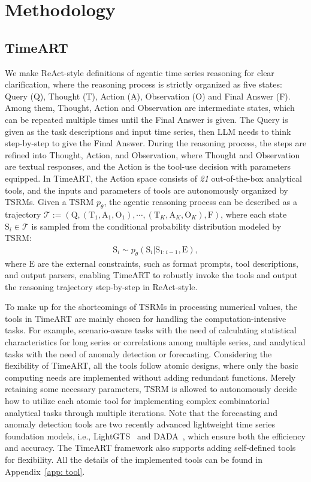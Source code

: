 \section{Methodology}

\subsection{TimeART}
\label{sec: timeart}
We make ReAct-style definitions of agentic time series reasoning for clear clarification, where the reasoning process is strictly organized as five states: Query (Q), Thought (T), Action (A), Observation (O) and Final Answer (F). Among them, Thought, Action and Observation are intermediate states, which can be repeated multiple times until the Final Answer is given. The Query is given as the task descriptions and input time series, then LLM needs to think step-by-step to give the Final Answer. During the reasoning process, the steps are refined into Thought, Action, and Observation, where Thought and Observation are textual responses, and the Action is the tool-use decision with parameters equipped. In TimeART, the Action space consists of \textit{21} out-of-the-box analytical tools, and the inputs and parameters of tools are autonomously organized by TSRMs. Given a TSRM $p_\theta$, the agentic reasoning process can be described as a trajectory $\mathcal{T} := (\mathrm{Q}, (\mathrm{T}_1, \mathrm{A}_1, \mathrm{O}_1),\cdots,(\mathrm{T}_K, \mathrm{A}_K, \mathrm{O}_K), \mathrm{F})$, where each state $\mathrm{S}_i \in \mathcal{T}$ is sampled from the conditional probability distribution modeled by TSRM:
\begin{gather}
    \mathrm{S}_i \sim p_\theta (\mathrm{S}_i|\mathrm{S}_{1:i-1}, \mathrm{E}),
\end{gather}
where $\mathrm{E}$ are the external constraints, such as format prompts, tool descriptions, and output parsers, enabling TimeART to robustly invoke the tools and output the reasoning trajectory step-by-step in ReAct-style. 

To make up for the shortcomings of TSRMs in processing numerical values, the tools in TimeART are mainly chosen for handling the computation-intensive tasks. For example, scenario-aware tasks with the need of calculating statistical characteristics for long series or correlations among multiple series, and analytical tasks with the need of anomaly detection or forecasting. Considering the flexibility of TimeART, all the tools follow atomic designs, where only the basic computing needs are implemented without adding redundant functions. Merely retaining some necessary parameters, TSRM is allowed to autonomously decide how to utilize each atomic tool for implementing complex combinatorial analytical tasks through multiple iterations. Note that the forecasting and anomaly detection tools are two recently advanced lightweight time series foundation models, i.e., LightGTS~\citep{wang2025lightgts} and DADA~\citep{shentu2024towards}, which ensure both the efficiency and accuracy. The TimeART framework also supports adding self-defined tools for flexibility. All the details of the implemented tools can be found in Appendix~\ref{app: tool}.


